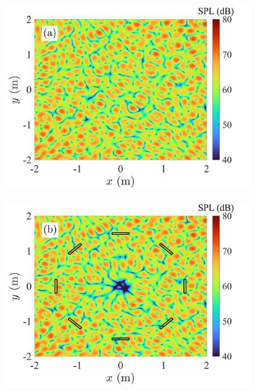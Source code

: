 \begin{figure}[!htb]
    \centering
    \begin{subfigure}{0.32\textwidth}
        \centering
        \includegraphics[width = \textwidth]{fig/cal_ANC_QuietZone_demo_pri_200503C_resize.jpg}
    \end{subfigure}
    \begin{subfigure}{0.32\textwidth}
        \centering
        \includegraphics[width = \textwidth]{fig/cal_ANC_QuietZone_demo_tot_PAL_200503C_resize.jpg}
    \end{subfigure}
    \begin{subfigure}{0.32\textwidth}
        \centering

\end{subfigure}
\end{figure}
